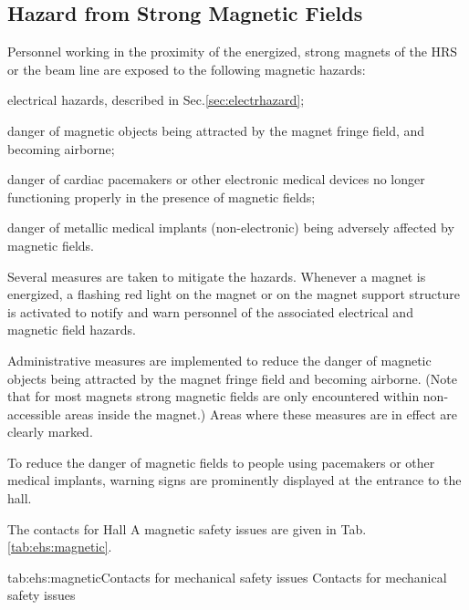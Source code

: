  
\begin{safetyen}{0}{0}
\section{Hazard from Strong Magnetic Fields} 
\label{sec:maghazard}
\end{safetyen}

 Personnel working in the proximity of the energized, strong  magnets of the HRS or the beam line
 are exposed to the following magnetic hazards:
 \begin{list}{--}{\setlength{\itemsep}{-0.cm}}
    \item electrical hazards, described in Sec.\ref{sec:electrhazard};
    \item danger of magnetic objects being attracted by the magnet fringe field, and becoming airborne;
    \item  danger of cardiac pacemakers or other electronic medical devices no longer
           functioning properly in the presence of magnetic fields;
    \item danger of metallic medical implants (non-electronic) being adversely affected
          by magnetic fields.
 \end{list}

 Several measures are taken to mitigate the hazards. 
 Whenever a magnet is energized, a flashing red light on the magnet or on the
 magnet support structure is activated to notify and warn personnel of 
 the associated electrical and magnetic field hazards.
 
 Administrative measures are implemented to
 reduce the danger of magnetic objects being attracted by the magnet 
 fringe field and becoming airborne. (Note that for most magnets strong magnetic 
 fields are only encountered within non-accessible areas inside the magnet.) 
 Areas where these measures are in effect are clearly marked.

 To reduce the danger of magnetic fields to people using pacemakers or other medical
 implants, warning signs are prominently displayed at the entrance to the hall. 

 The contacts for Hall A magnetic safety issues are given in Tab.\ref{tab:ehs:magnetic}.
 
 \begin{namestab}{tab:ehs:magnetic}{Contacts for mechanical safety issues}{%
   Contacts for mechanical safety issues}
 \end{namestab}

